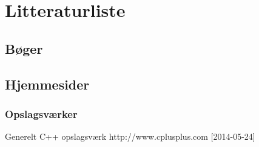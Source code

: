 \chapter{Litteraturliste}

\section{Bøger}




\section{Hjemmesider}


\subsection{Opslagsværker}
Generelt C++ opslagsværk
http://www.cplusplus.com [2014-05-24]
